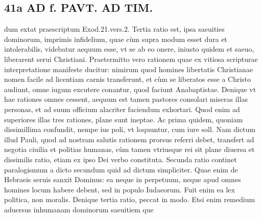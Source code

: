 \documentclass{article}
\begin{document}
\begin{pages}
\section*{41a AD f. PAVT. AD TIM. }\pstart dum extat praescriptum Exod.21.vers.2.  \pend\pstart Tertia ratio est, ipsa saeuities dominorum, imprimis infidelium, quae cùm supra modum esset dura et intolerabilis, videbatur aequum esse, vt se ab eo onere, iniusto quidem et saeuo, liberarent serui Christiani. Praetermitto vero rationem quae ex vitiosa scripturae interpretatione manifeste ducitur: nimirum quod homines libertatis Christianae nomen facile ad licentiam carnis transferunt, et cùm se liberatos esse a Christo audiunt, omne iugum excutere conantur, quod faciunt Anabaptistae.  \pend\pstart Denique vt hae rationes omnes cessent, aequum est tamen pastores consolari miseras illas personas, et ad suum officium alacriter faciendum exhortari.  \pend\pstart Quod enim ad superiores illas tres rationes, plane sunt ineptae. Ac prima quidem, quoniam dissimillima confundit, nempe ius poli, vt loquuntur, cum iure soll. Nam dictum illud Pauli, quod ad nostram salutis rationem prorsus referri debet, transfert ad negotia ciuilia et politias humanas, cùm tamen vtriusque rei sit plane diuersa et dissimilis ratio, etiam ex ipso Dei verbo constituta.  \pend\pstart Secunda ratio continet paralogismum a dicto secundum quid ad dictum simpliciter. Quae enim de Hebraeis seruis sanxit Dominus: ea neque in perpetuum, neque apud omnes homines locum habere debent, sed in populo Iudaeorum. Fuit enim ea lex politica, non moralis. Denique tertia ratio, peccat in modo. Etsi enim remedium aduersus inhumanam dominorum saeuitiem que\pend

\end{pages}
\end{document}
